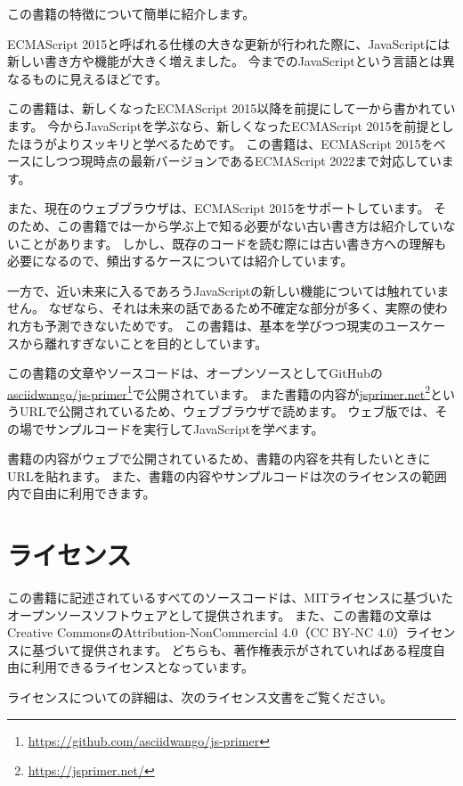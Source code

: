 この書籍の特徴について簡単に紹介します。

ECMAScript 2015と呼ばれる仕様の大きな更新が行われた際に、JavaScriptには新しい書き方や機能が大きく増えました。
今までのJavaScriptという言語とは異なるものに見えるほどです。

この書籍は、新しくなったECMAScript 2015以降を前提にして一から書かれています。
今からJavaScriptを学ぶなら、新しくなったECMAScript 2015を前提としたほうがよりスッキリと学べるためです。
この書籍は、ECMAScript 2015をベースにしつつ現時点の最新バージョンであるECMAScript 2022まで対応しています。

また、現在のウェブブラウザは、ECMAScript 2015をサポートしています。
そのため、この書籍では一から学ぶ上で知る必要がない古い書き方は紹介していないことがあります。
しかし、既存のコードを読む際には古い書き方への理解も必要になるので、頻出するケースについては紹介しています。

一方で、近い未来に入るであろうJavaScriptの新しい機能については触れていません。
なぜなら、それは未来の話であるため不確定な部分が多く、実際の使われ方も予測できないためです。
この書籍は、基本を学びつつ現実のユースケースから離れすぎないことを目的としています。

この書籍の文章やソースコードは、オープンソースとしてGitHubの\href{https://github.com/asciidwango/js-primer}{asciidwango/js-primer}\footnote{\url{https://github.com/asciidwango/js-primer}}で公開されています。
また書籍の内容が\href{https://jsprimer.net/}{jsprimer.net}\footnote{\url{https://jsprimer.net/}}というURLで公開されているため、ウェブブラウザで読めます。
ウェブ版では、その場でサンプルコードを実行してJavaScriptを学べます。

書籍の内容がウェブで公開されているため、書籍の内容を共有したいときにURLを貼れます。
また、書籍の内容やサンプルコードは次のライセンスの範囲内で自由に利用できます。

\hypertarget{license}{%
\section*{ライセンス}\label{license}}

この書籍に記述されているすべてのソースコードは、MITライセンスに基づいたオープンソースソフトウェアとして提供されます。
また、この書籍の文章はCreative CommonsのAttribution-NonCommercial
4.0（CC BY-NC 4.0）ライセンスに基づいて提供されます。
どちらも、著作権表示がされていればある程度自由に利用できるライセンスとなっています。

ライセンスについての詳細は、次のライセンス文書をご覧ください。

